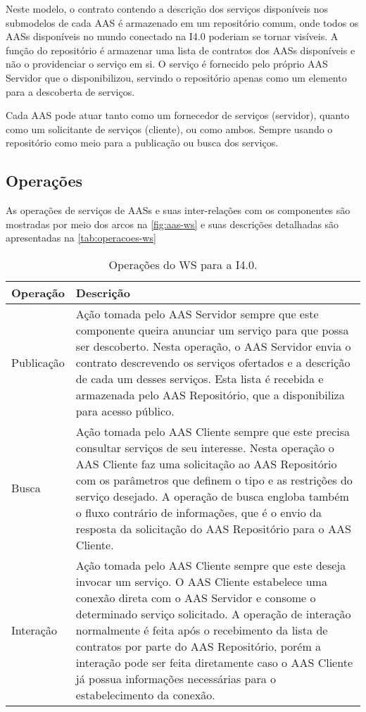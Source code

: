 	Neste modelo, o contrato contendo a descrição dos serviços disponíveis nos submodelos de cada AAS é armazenado em um repositório comum, onde todos os AASs disponíveis no mundo conectado na I4.0 poderiam se tornar visíveis. A função do repositório é armazenar uma lista de contratos dos AASs disponíveis e não o providenciar o serviço em si. O serviço é fornecido pelo próprio AAS Servidor que o disponibilizou, servindo o repositório apenas como um elemento para a descoberta de serviços.

	Cada AAS pode atuar tanto como um fornecedor de serviços (servidor), quanto como um solicitante de serviços (cliente), ou como ambos. Sempre usando o repositório como meio para a publicação ou busca dos serviços.

\subsection{Operações}

	As operações de serviços de AASs e suas inter-relações com os componentes são mostradas por meio dos arcos na \autoref{fig:aas-ws} e suas descrições detalhadas são apresentadas na \autoref{tab:operacoes-ws}
	
	\begin{table}[htb]
		\centering
		\label{tab:operacoes-ws}
		\begin{tabular}{p{3cm}p{12cm}}
			\hline
			\textbf{Operação}
			& \textbf{Descrição} \\ 
			
			\hline
			Publicação
			& Ação tomada pelo AAS Servidor sempre que este componente queira anunciar um serviço para que possa ser descoberto. Nesta operação, o AAS Servidor envia o contrato descrevendo os serviços ofertados e a descrição de cada um desses serviços. Esta lista é recebida e armazenada pelo AAS Repositório, que a disponibiliza para acesso público. \\
			
			\hline
			Busca
			& Ação tomada pelo AAS Cliente sempre que este precisa consultar serviços de seu interesse. Nesta operação o AAS Cliente faz uma solicitação ao AAS Repositório com os parâmetros que definem o tipo e as restrições do serviço desejado. A operação de busca engloba também o fluxo contrário de informações, que é o envio da resposta da solicitação do AAS Repositório para o AAS Cliente. \\
			
			\hline
			Interação
			& Ação tomada pelo AAS Cliente sempre que este deseja invocar um serviço. O AAS Cliente estabelece uma conexão direta com o AAS Servidor e consome o determinado serviço solicitado. A operação de interação normalmente é feita após o recebimento da lista de contratos por parte do AAS Repositório, porém a interação pode ser feita diretamente caso o AAS Cliente já possua informações necessárias para o estabelecimento da conexão.  \\
			
			\hline
		\end{tabular}
		\caption{Operações do WS para a I4.0.}
	\end{table}

